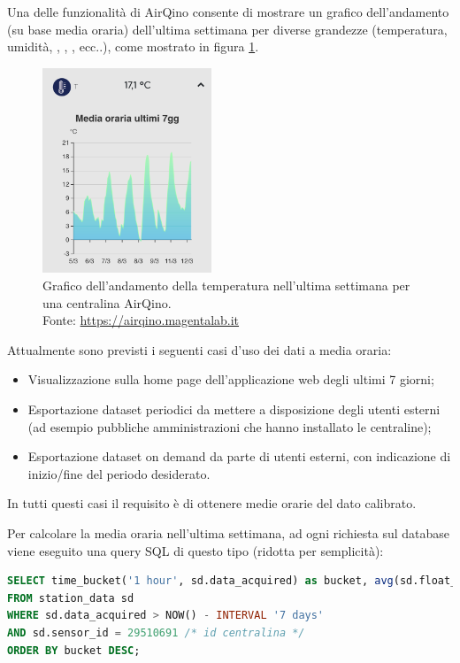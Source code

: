 Una delle funzionalità di AirQino consente di mostrare un grafico dell'andamento (su base media oraria) dell'ultima settimana per diverse grandezze (temperatura, umidità, , , ,  ecc..), come mostrato in figura \ref{fig:airqino-temp}.

\begin{figure}[H]
\centering
\captionsetup{justification=centering}
\includegraphics[width=0.45\textwidth,height=\textheight,keepaspectratio]{img/airqino_temp}
\caption{Grafico dell'andamento della temperatura nell'ultima settimana per una centralina AirQino.\\Fonte: \url{https://airqino.magentalab.it}}
\label{fig:airqino-temp}
\end{figure}

Attualmente sono previsti i seguenti casi d’uso dei dati a media oraria:
\begin{itemize}
  \item Visualizzazione sulla home page dell’applicazione web degli ultimi 7 giorni;
  \item Esportazione dataset periodici da mettere a disposizione degli utenti esterni (ad esempio pubbliche amministrazioni che hanno installato le centraline);
  \item Esportazione dataset on demand da parte di utenti esterni, con indicazione di inizio/fine del periodo desiderato.
\end{itemize}
In tutti questi casi il requisito è di ottenere medie orarie del dato calibrato.

Per calcolare la media oraria nell'ultima settimana, ad ogni richiesta sul database viene eseguito una query SQL di questo tipo (ridotta per semplicità):

\vspace{1mm}
\begin{lstlisting}[language=sql]
SELECT time_bucket('1 hour', sd.data_acquired) as bucket, avg(sd.float_value)
FROM station_data sd
WHERE sd.data_acquired > NOW() - INTERVAL '7 days'
AND sd.sensor_id = 29510691 /* id centralina */
ORDER BY bucket DESC;
\end{lstlisting}


